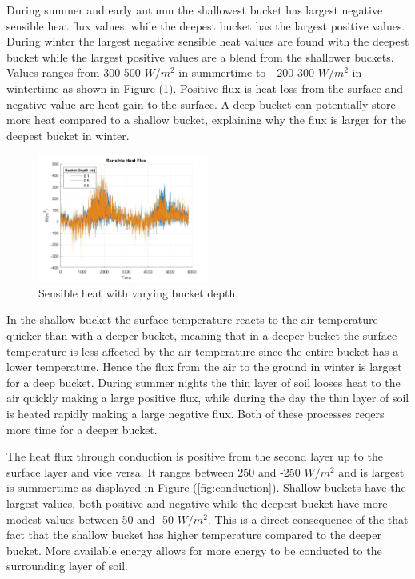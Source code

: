 \documentclass[a4paper,11pt,twocolumn]{article}
\begin{document}
During summer and early autumn the shallowest bucket has largest negative sensible heat flux values, while the deepest bucket has the largest positive values. During winter the largest negative sensible heat values are found with the deepest bucket while the largest positive values are a blend from the shallower buckets. Values ranges from 300-500 $W/m^{2}$ in summertime to - 200-300 $W/m^{2}$ in wintertime as shown in Figure (\ref{fig:sensible}). Positive flux is heat loss from the surface and negative value are heat gain to the surface. A deep bucket can potentially store more heat compared to a shallow bucket, explaining why the flux is larger for the deepest bucket in winter. 

\begin{figure}[h]
	\centering 
	\includegraphics[width=0.5\textwidth]{figures/sensible_heat}
	\caption{Sensible heat with varying bucket depth.}
	\label{fig:sensible}
\end{figure} 

In the shallow bucket the surface temperature reacts to the air temperature quicker than with a deeper bucket, meaning that in a deeper bucket the surface temperature is less affected by the air temperature since the entire bucket has a lower temperature. Hence the flux from the air to the ground in winter is largest for a deep bucket. During summer nights the thin layer of soil looses heat to the air quickly making a large positive flux, while during the day the thin layer of soil is heated rapidly making a large negative flux. Both of these processes reqers more time for a deeper bucket. 

The heat flux through conduction is  positive from the second layer up to the surface layer and vice versa. It ranges between 250 and -250 $W/m^2$ and is largest is summertime as displayed in Figure (\ref{fig:conduction}). Shallow buckets have the largest values, both positive and negative while the deepest bucket have more modest values between 50 and -50 $W/m^2$. This is a direct consequence of the that fact that the shallow bucket has higher temperature compared to the deeper bucket. More available energy allows for more energy to be conducted to the surrounding layer of soil.
\end{document}

